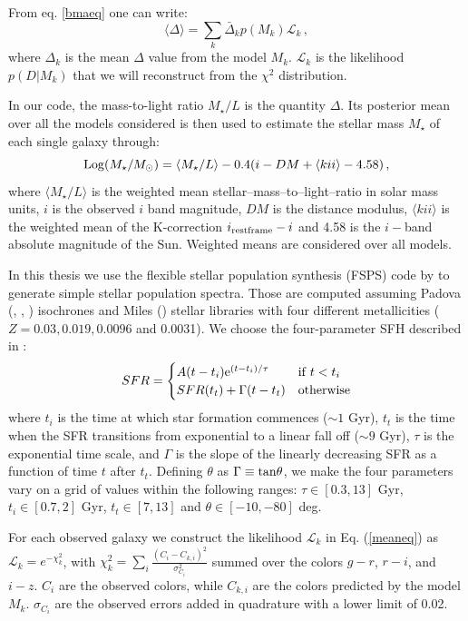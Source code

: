 From eq. \ref{bmaeq} one can write:
\begin{equation}
\langle\Delta\rangle=\sum_k \bar{\Delta}_k p(M_k)\mathcal{L}_k\, , \label{meaneq}
\end{equation}
where $\Delta_k$ is the mean $\Delta$ value from the model $M_k$. $\mathcal{L}_k$ is the likelihood $p(D|M_k)$ that we will reconstruct from the $\chi^2$ distribution.

In our code, the mass-to-light ratio $M_\star/L$ is the quantity $\Delta$. Its posterior mean over all the models considered is then used to estimate the stellar mass $M_\star$ of each single galaxy through:
\begin{equation}
{\rm Log}{(M_\star/M_{\odot})}=\langle M_\star/L \rangle-0.4(i-DM+\langle kii \rangle -4.58)\,,
\end{equation}
where $\langle M_\star/L \rangle$ is the weighted mean stellar--mass--to--light--ratio in solar mass units, $i$ is the observed $i$ band magnitude, $DM$ is the distance modulus,  $\langle kii \rangle$ is the weighted mean of the K-correction $i_{\rm rest frame}-i$ and 4.58 is the $i-$band absolute magnitude of the Sun. Weighted means are considered over all models.

In this thesis we use the flexible stellar population synthesis (FSPS) code by \citet{fsps} to generate  simple  stellar population spectra. Those are computed assuming Padova (\citealt{padova1}, \citealt{padova2}, \citealt{padova3}) isochrones  and Miles (\citealt{miles}) stellar libraries with four different metallicities ($Z=0.03,0.019,0.0096$ and 0.0031). We choose the four-parameter SFH described in \citet{simha}:
\[
SFR=
\begin{cases} A(t-t_i){\rm e}^{(t-t_i)/\tau} & {\rm if }\; t<t_i\\
SFR(t_t)+\Gamma(t-t_t) &{\rm otherwise}
\end{cases}
\]
where $t_i$ is the time at which star formation commences ($\sim 1$ Gyr), $t_t$ is the time when the SFR transitions from exponential to a linear fall off ($\sim 9$ Gyr), $\tau$ is the exponential time scale, and $\Gamma$ is the slope of the linearly decreasing SFR as a function of time $t$ after $t_t$. Defining $\theta$ as $\Gamma\equiv{\rm tan}\theta$, we make the  four parameters vary on a grid of values within the following ranges: $\tau\in [0.3,13]$ Gyr, $t_i \in [0.7,2]$ Gyr, $t_t \in [7,13]$ and $\theta\in [-10,-80 ]$ deg.

For each observed galaxy we construct the likelihood $\mathcal{L}_k$ in Eq. (\ref{meaneq}) as $\mathcal{L}_k=e^{-\chi^2_k}$, with $\chi^2_k=\sum_i\frac{(C_i-C_{k,i})^2}{\sigma_{C_i}^2}$ summed over the colors $g-r$, $r-i$, and $i-z$. $C_i$ are the observed colors, while $C_{k,i}$ are the colors predicted by the model $M_k$. $\sigma_{C_i}$ are the observed errors added in quadrature with a lower limit of 0.02. 

